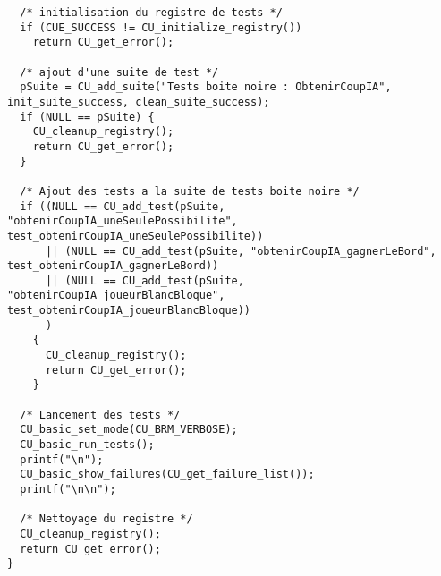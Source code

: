 \begin{lstlisting}
  /* initialisation du registre de tests */
  if (CUE_SUCCESS != CU_initialize_registry())
    return CU_get_error();

  /* ajout d'une suite de test */
  pSuite = CU_add_suite("Tests boite noire : ObtenirCoupIA", init_suite_success, clean_suite_success);
  if (NULL == pSuite) {
    CU_cleanup_registry();
    return CU_get_error();
  }

  /* Ajout des tests a la suite de tests boite noire */
  if ((NULL == CU_add_test(pSuite, "obtenirCoupIA_uneSeulePossibilite", test_obtenirCoupIA_uneSeulePossibilite))
      || (NULL == CU_add_test(pSuite, "obtenirCoupIA_gagnerLeBord", test_obtenirCoupIA_gagnerLeBord))
      || (NULL == CU_add_test(pSuite, "obtenirCoupIA_joueurBlancBloque", test_obtenirCoupIA_joueurBlancBloque))
      )
    {
      CU_cleanup_registry();
      return CU_get_error();
    }

  /* Lancement des tests */
  CU_basic_set_mode(CU_BRM_VERBOSE);
  CU_basic_run_tests();
  printf("\n");
  CU_basic_show_failures(CU_get_failure_list());
  printf("\n\n");

  /* Nettoyage du registre */
  CU_cleanup_registry();
  return CU_get_error();
}
\end{lstlisting}

